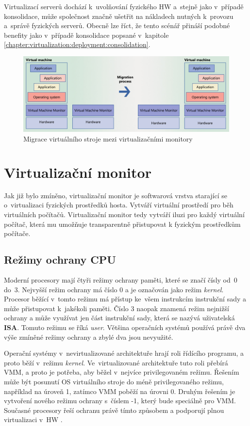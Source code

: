 Virtualizací serverů dochází k~uvolňování fyzického HW a~stejně jako v~případě konsolidace, může společnost značně ušetřit
na nákladech nutných k~provozu a~správě fyzických serverů. Obecně lze říct, že tento scénář přináší podobné benefity jako
v~případě konsolidace popsané v~kapitole \ref{chapter:virtualization:deployment:consolidation}.
\begin{figure}
    \centering    
    \label{figure:migration:virtual}
    \includegraphics[scale=0.51]{assets/pdfs/migration.pdf}
    \caption{Migrace virtuálního stroje mezi virtualizačními monitory}
\end{figure}
\section{Virtualizační monitor}
\label{chapter:virtualization:vmm}
Jak již bylo zmíněno, virtualizační monitor je softwarová vrstva starající se o~virtualizaci fyzických prostředků hosta.
Vytváří virtuální prostředí pro běh virtuálních počítačů. Virtualizační monitor tedy vytváří iluzi pro každý virtuální počítač, která
mu umožňuje transparentně přistupovat k fyzickým prostředkům počítače.
\subsection{Režimy ochrany CPU}
\label{chapter:virtualization:rings}
Moderní procesory mají čtyři režimy ochrany paměti, které se značí čísly od~0 do~3. Nejvyšší režim ochrany má číslo 0 a je
označován jako režim \textit{kernel}. Procesor běžící v~tomto režimu má přístup ke~všem instrukcím instrukční sady a může 
přistupovat k~jakékoli paměti. Číslo 3 naopak znamená režim nejnižší ochrany a může využívat jen část instrukční sady, která
se nazývá uživatelská \textbf{ISA}. Tomuto režimu se říká \textit{user}. Většina operačních systémů používá právě 
dva výše zmíněné režimy ochrany a zbylé dva jsou nevyužité.

Operační systémy v~nevirtualizované architektuře hrají roli řídícího programu, a proto běží v~režimu \textit{kernel}. Ve~virtualizované
architektuře tuto roli přebírá VMM, a proto je potřeba, aby běžel v~nejvíce privilegovaném režimu. Řešením může být posunutí
OS virtuálního stroje do méně privilegovaného režimu, například na úroveň 1, zatímco VMM poběží na úrovni 0. Druhým řešením
je vytvoření nového režimu ochrany s~číslem -1, který bude speciálně pro VMM. Současné procesory řeší ochranu právě tímto
způsobem a podporují plnou virtualizaci v~HW \cite{cvut:presentation:virt2}.

